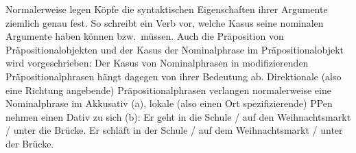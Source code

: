 \noindent
Normalerweise legen Köpfe die syntaktischen Eigenschaften ihrer Argumente
ziemlich genau fest. So schreibt ein Verb vor, welche Kasus seine nominalen
Argumente haben können bzw.\ müssen.
\eal
{}
\zl
Auch die Präposition von Präpositionalobjekten und der Kasus der Nominalphrase
im Präpositionalobjekt wird vorgeschrieben:
\eal
{}
\zl
Der Kasus von Nominalphrasen in modifizierenden Präpositionalphrasen hängt dagegen
von ihrer Bedeutung ab. Direktionale (also eine Richtung angebende) Präpositionalphrasen 
verlangen normalerweise eine Nominalphrase im Akkusativ (a), lokale (also einen Ort spezifizierende)
PPen nehmen einen Dativ zu sich (b):
\eal
\ex Er geht in die Schule / auf den Weihnachtsmarkt / unter die Brücke.
\ex Er schläft in der Schule / auf dem Weihnachtsmarkt / unter der Brücke.
\zl

